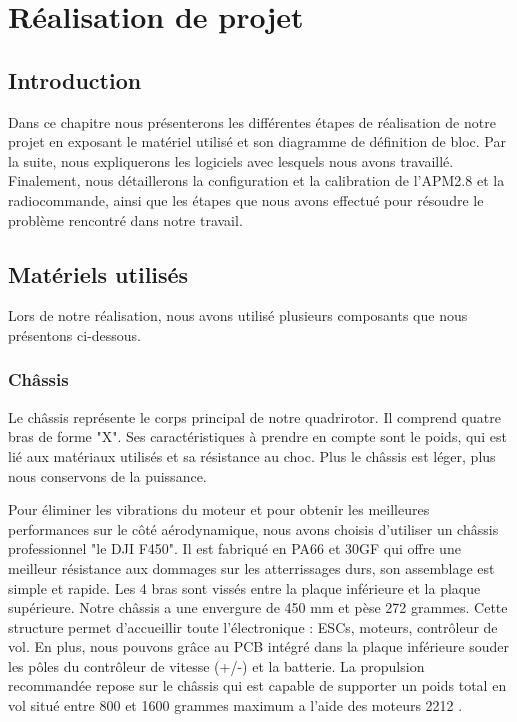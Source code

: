 

	

\chapter{Réalisation de projet}
\newpage
	\section*{Introduction}
	
	Dans ce chapitre nous présenterons les différentes étapes de réalisation de notre projet en exposant le matériel utilisé et son diagramme de définition de bloc. Par la suite, nous expliquerons les logiciels avec lesquels nous avons travaillé. Finalement, nous détaillerons la configuration et la calibration de l'APM2.8 et la radiocommande, ainsi que les étapes que nous avons effectué pour résoudre le problème rencontré dans notre travail. 
	
	\section{Matériels utilisés}
	Lors de notre réalisation, nous avons utilisé plusieurs composants que nous présentons ci-dessous.
	\subsection{Châssis}
	Le châssis représente le corps principal de notre quadrirotor. Il comprend quatre bras de forme "X". Ses caractéristiques à prendre en compte sont le poids, qui est lié aux matériaux utilisés et sa résistance au choc. Plus le châssis est léger, plus nous conservons de la puissance.
	
	Pour éliminer les vibrations du moteur et pour obtenir les meilleures performances sur le côté aérodynamique, nous avons choisis d’utiliser un châssis professionnel "le DJI F450". Il est fabriqué en PA66 et 30GF qui offre une meilleur résistance aux dommages sur les atterrissages durs\cite{smartcube}, son assemblage est simple et rapide. Les 4 bras sont vissés entre la plaque inférieure et la plaque supérieure. Notre châssis a une envergure de 450 mm et pèse 272 grammes.
	Cette structure permet d'accueillir toute l'électronique : ESCs, moteurs, contrôleur de vol. En plus, nous pouvons grâce au PCB intégré dans la plaque inférieure souder les pôles du contrôleur de vitesse (+/-) et la batterie. La propulsion recommandée repose sur le châssis qui est capable de supporter un poids total en vol situé entre 800 et 1600 grammes maximum a l'aide des moteurs 2212 \cite{studiosport}.
	
